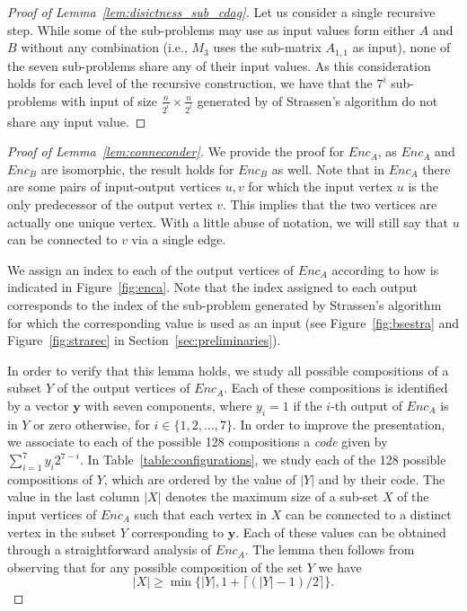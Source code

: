 \documentclass[a4paper,UKenglish]{lipics-v2016}
\begin{document}
\label{app:proof_encoder}
\begin{proof}[Proof of Lemma~\ref{lem:disictness_sub_cdag}]
	Let us consider a single recursive step. While some of the sub-problems may use as input values form either $A$ and $B$ without any combination (i.e., $M_3$ uses the sub-matrix $A_{1,1}$ as input), none of the seven sub-problems share any of their input values. As this consideration holds for each level of the recursive construction, we have that the $7^i$ sub-problems with input of size $\frac{n}{2^i}\times\frac{n}{2^i}$ generated by of Strassen's algorithm do not share any input value.
\end{proof}

\begin{proof}[Proof of Lemma~\ref{lem:conneconder}]
We provide the proof for $Enc_A$, as $Enc_A$ and $Enc_B$ are isomorphic,  the result holds for $Enc_B$ as well. 
	Note that in $Enc_A$ there are some pairs of input-output vertices $u,v$ for which the input vertex $u$ is the only predecessor of the output vertex $v$. This implies that the two vertices are actually one unique vertex. With a little abuse of notation, we will still say that $u$  can be connected to $v$ via a single edge.
		
	We assign an index to each of the output vertices of $Enc_A$ according to how is indicated in Figure~\ref{fig:enca}.  
Note that the index assigned to each output corresponds to the index of the sub-problem generated by Strassen's algorithm for which the corresponding value is used as an input (see Figure~\ref{fig:bsestra} and Figure~\ref{fig:strarec} in Section~\ref{sec:preliminaries}). 

In order to verify that this lemma holds, we study all possible compositions of a subset $Y$ of the output vertices of $Enc_A$.  Each of these compositions is identified by a vector $\mathbf{y}$ with seven components, where $y_i = 1$ if the $i$-th output of $Enc_A$ is in $Y$ or zero otherwise, for $i\in\{1,2,\ldots,7\}$. In order to improve the presentation, we associate to each of the possible 128 compositions a \emph{code} given by $\sum_{i=1}^7 y_i2^{7-i}$. In Table~\ref{table:configurations}, we study each of the 128 possible compositions of $Y$, which are ordered by the value of $|Y|$ and by their code. The value in the last column $|X|$ denotes the maximum size of a sub-set $X$ of the input vertices of $Enc_A$ such that each vertex in $X$ can be connected to a distinct vertex in the subset $Y$ corresponding to $\mathbf{y}$. Each of these values can be obtained through a straightforward analysis of $Enc_A$.
The lemma then follows from observing that for any possible composition of the set $Y$ we have
\begin{equation*}
	|X|\geq \min \Big\{|Y|, 1 + \lceil\left(|Y|-1\right)/2\rceil\} .
\end{equation*}
\end{proof}
\end{document}
